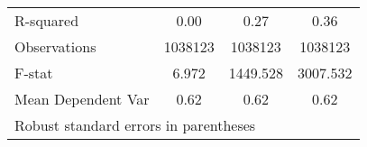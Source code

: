 {\begin{tabular}{l*{3}{c}}
\hline
R-squared           &        0.00         &        0.27         &        0.36         \\
Observations        &     1038123         &     1038123         &     1038123         \\
F-stat              &       6.972         &    1449.528         &    3007.532         \\
Mean Dependent Var  &        0.62         &        0.62         &        0.62         \\
\hline\hline
\multicolumn{4}{l}{\footnotesize Robust standard errors in parentheses}\\
\end{tabular}
}
